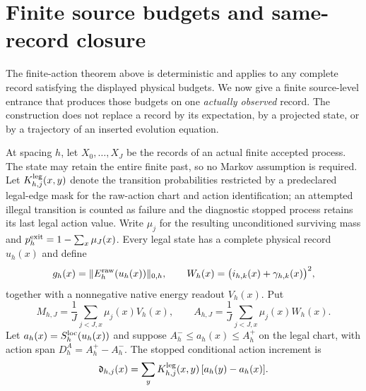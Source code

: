 \documentclass[11pt]{article}
\numberwithin{equation}{section}
\theoremstyle{definition}
\theoremstyle{remark}
\newcommand{\norm}[1]{\lVert#1\rVert}
\begin{document}
\section{Finite source budgets and same-record closure}
\label{sec:native-selection}

The finite-action theorem above is deterministic and applies to any complete record satisfying the displayed physical budgets.  We now give a finite source-level entrance that produces those budgets on one \emph{actually observed} record.  The construction does not replace a record by its expectation, by a projected state, or by a trajectory of an inserted evolution equation.

At spacing $h$, let $X_0,\ldots,X_J$ be the records of an actual finite accepted process.  The state may retain the entire finite past, so no Markov assumption is required.  Let $K^{\rm leg}_{h,j}(x,y)$ denote the transition probabilities restricted by a predeclared legal-edge mask for the raw-action chart and action identification; an attempted illegal transition is counted as failure and the diagnostic stopped process retains its last legal action value.  Write $\mu_j$ for the resulting unconditioned surviving mass and $p_h^{\rm exit}=1-\sum_x\mu_J(x)$.  Every legal state has a complete physical record $u_h(x)$ and define
\begin{equation}
 g_h(x)=\norm{E_h^{\rm raw}(u_h(x))}_{0,h},\qquad
 W_h(x)=\bigl(i_{h,k}(x)+\gamma_{h,k}(x)\bigr)^2,
 \label{eq:source-gW}
\end{equation}
together with a nonnegative native energy readout $V_h(x)$.  Put
\begin{equation}
 M_{h,J}=\frac1J\sum_{j<J,x}\mu_j(x)V_h(x),\qquad
 A_{h,J}=\frac1J\sum_{j<J,x}\mu_j(x)W_h(x).
 \label{eq:source-occupations}
\end{equation}
Let $a_h(x)=S_h^{\rm loc}(u_h(x))$ and suppose $A_h^-\le a_h(x)\le A_h^+$ on the legal chart, with action span $D_h^A=A_h^+-A_h^-$.  The stopped conditional action increment is
\begin{equation}
 \mathfrak d_{h,j}(x)=\sum_yK^{\rm leg}_{h,j}(x,y)\,[a_h(y)-a_h(x)].
 \label{eq:source-action-drift}
\end{equation}
\end{document}
